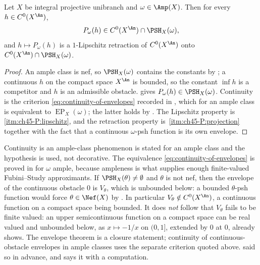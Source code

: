 \begin{corollary}
\label{cor:ch45-continuity-envelopes}
Let $X$ be integral projective unibranch and $\omega\in\Amp(X)$.  Then
for every $h\in C^0(X^{\An})$,
\[
 P_\omega(h)\in C^0(X^{\An})\cap\PSH_X(\omega),
\]
and $h\mapsto P_\omega(h)$ is a $1$-Lipschitz retraction of
$C^0(X^{\An})$ onto $C^0(X^{\An})\cap\PSH_X(\omega)$.
\end{corollary}

\begin{proof}
An ample class is nef, so $\PSH_X(\omega)$ contains the constants by
; a continuous $h$ on the compact space
$X^{\An}$ is bounded, so the constant $\inf h$ is a competitor and $h$
is an admissible obstacle.   gives
$P_\omega(h)\in\PSH_X(\omega)$.  Continuity is the criterion
\eqref{eq:continuity-of-envelopes} recorded in
, which for an ample class is equivalent to
$\operatorname{EP}_X(\omega)$; the latter holds by
.  The Lipschitz property is
\,\cref{itm:ch45-P:lipschitz}, and the
retraction property is
\,\cref{itm:ch45-P:projection}
together with the fact that a continuous $\omega$-psh function is its own
envelope.
\end{proof}

\begin{warning}{Continuity is an ample-class phenomenon}
\label{warn:ch45-continuity-ample}
 is stated for an ample class and the
hypothesis is used, not decorative.  The equivalence
\eqref{eq:continuity-of-envelopes} is proved in
 for $\omega$ ample, because ampleness is
what supplies enough finite-valued Fubini--Study approximants.  If
$\PSH_X(\theta)\ne\emptyset$ and $\theta$ is not nef, then the envelope
of the continuous obstacle $0$ is $V_\theta$, which is unbounded below:
a bounded $\theta$-psh function would force $\theta\in\Nef(X)$ by
.  In particular $V_\theta\notin
C^0(X^{\An})$, a continuous function on a compact space being bounded.  It
does \emph{not} follow that $V_\theta$ fails to be finite valued: an upper
semicontinuous function on a compact space can be real valued and unbounded
below, as $x\mapsto-1/x$ on $(0,1]$, extended by $0$ at $0$,
already shows.  The envelope theorem is a
closure statement; continuity of continuous-obstacle envelopes in ample
classes uses the separate criterion quoted above.
 said so in advance, and
 says it with a computation.
\end{warning}

